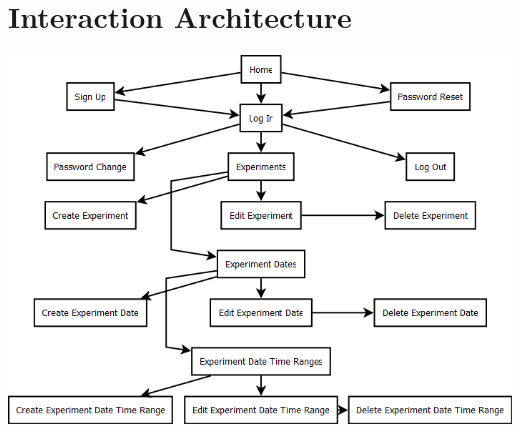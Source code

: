 \section{Interaction Architecture}
\includegraphics[width=6in]{../other/interaction-architecture/interaction-architecture.png}
